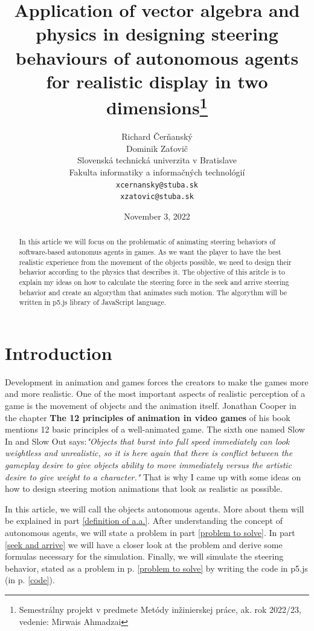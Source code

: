 \documentclass[10pt,twoside,english,a4paper]{article}
\title{Application of vector algebra and physics in 
designing steering behaviours of autonomous agents for 
realistic display in two dimensions\thanks{Semestrálny projekt v 
predmete Metódy inžinierskej práce, ak. rok 2022/23, 
vedenie: Mirwais Ahmadzai}}
\author{Richard Čerňanský\\
		Dominik Zaťovič\\[2pt]
	{\small Slovenská technická univerzita v Bratislave}\\
	{\small Fakulta informatiky a informačných technológií}\\
	{\small \texttt{xcernansky@stuba.sk}}\\
	{\small \texttt{xzatovic@stuba.sk}}
	}
\date{\small November 3, 2022 }
\begin{document}
\maketitle

\begin{abstract}

In this article we will focus on the problematic of animating steering 
behaviors of software-based autonomus agents in 
games. As we want the player to have the best realistic experience
from the movement of the objects possible, we need to design 
their behavior according to the physics that describes it. 
The objective of this aritcle is to explain my ideas on how to calculate 
the steering force in the seek and arrive steering behavior and create 
an algorythm that animates such motion. The algorythm will be written
in p5.js library of JavaScript language. 

\end{abstract}

\section{Introduction}

Development in animation and games forces the creators to make 
the games more and more realistic. One of the most important 
aspects of realistic perception of a game is the movement of 
objects and the animation itself. Jonathan Cooper in the chapter 
\textbf{The 12 principles of animation in video games}\cite{Cooper} 
of his book mentions 12 basic principles of a well-animated game. 
The sixth one named Slow In and Slow Out says:\emph{"Objects that burst into full 
speed immediately can look weightless and unrealistic, so it is here 
again that there is conflict between the gameplay desire to give 
objects ability to move immediately versus the artistic desire to give weight 
to a character."} That is why I came up with some ideas on how to 
design steering motion animations that look as realistic as possible.

In this article, we will call the objects autonomous agents. 
More about them will be explained in part \ref{definition of a.a.}. 
After understanding the concept of autonomous agents, we will state 
a problem in part \ref{problem to solve}. In part \ref{seek and 
arrive} we will have a closer look at the problem and derive some 
formulas necessary for the simulation. Finally, we will simulate 
the steering behavior, stated as a problem in p. \ref{problem to 
solve} by writing the code in p5.js (in p. \ref{code}).
\end{document}
